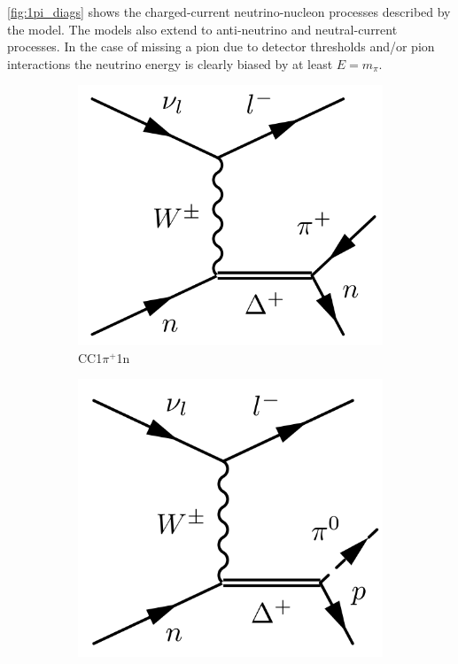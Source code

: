 \autoref{fig:1pi_diags} shows the charged-current neutrino-nucleon processes described by the model. The models also extend to anti-neutrino and neutral-current processes. In the case of missing a pion due to detector thresholds and/or pion interactions the neutrino energy is clearly biased by at least $E=m_\pi$.
\begin{figure}[h]
	\centering
	\begin{subfigure}[t]{0.32\textwidth}
		\includegraphics[width=\textwidth, trim={0mm 0mm 0mm 0mm}, clip,page=1]{figures/niwg/diagrams/CC1npip}
		\caption{CC1$\pi^+$1n}
	\end{subfigure}
	\begin{subfigure}[t]{0.32\textwidth}
		\includegraphics[width=\textwidth, trim={0mm 0mm 0mm 0mm}, clip,page=1]{figures/niwg/diagrams/CC1pi0}

\end{subfigure}
\end{figure}

